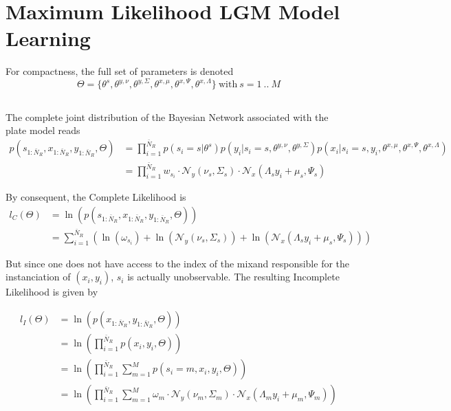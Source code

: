 \section{Maximum Likelihood LGM Model Learning}
For compactness, the full set of parameters is denoted
\begin{equation}
\Theta =\{\theta^s,\theta^{y,\nu}, \theta^{y,\Sigma}, \theta^{x,\mu}, \theta^{x,\Psi}, \theta^{x,\Lambda}\}\ \mathrm{with}\ s = 1\ ..\ M
\end{equation}
\subsection{}
The complete joint  distribution of the Bayesian Network associated with the plate model reads
\begin{align}
p(s_{1:\bar{N}_R},x_{1:\bar{N}_R},y_{1:\bar{N}_R},\Theta) &= \prod\limits_{i = 1}^{\bar{N}_R}p(s_i = s\vert\theta^s)
p(y_i\vert s_i = s, \theta^{y,\nu}, \theta^{y,\Sigma})p(x_i\vert s_i = s,y_i, \theta^{x,\mu}, \theta^{x,\Psi}, \theta^{x,\Lambda})
\nonumber \\ &=  \prod\limits_{i = 1}^{\bar{N}_R}w_{s_i}\cdot
\mathcal{N}_y\left(\nu_s,\Sigma_s\right)\cdot\mathcal{N}_x\left(\Lambda_sy_i + \mu_s,\Psi_s\right)
\end{align}

By consequent, the Complete Likelihood is
\begin{align}
l_C(\Theta)& = \ln\left(p(s_{1:\bar{N}_R},x_{1:\bar{N}_R},y_{1:\bar{N}_R},\Theta)\right)\nonumber\\
&= \sum\limits_{i = 1}^{\bar{N}_R}\left(\ln(\omega_{s_i}) + \ln\left(\mathcal{N}_y\left(\nu_s,\Sigma_s\right)\right)+ \ln\left(\mathcal{N}_x\left(\Lambda_sy_i + \mu_s,\Psi_s\right)\right)\right) 
\end{align}

But since one does not have access to the index of the mixand responsible for the instanciation of $(x_i,y_i)$, $s_i$ is actually unobservable. The resulting Incomplete Likelihood is given by

\begin{align}
l_I(\Theta)& = \ln\left(p(x_{1:\bar{N}_R},y_{1:\bar{N}_R},\Theta)\right)\nonumber\\
&=  \ln\left(\prod\limits_{i = 1}^{\bar{N}_R}p(x_i,y_i,\Theta)\right)\nonumber\\
&= \ln\left(\prod\limits_{i = 1}^{\bar{N}_R}\sum\limits_{m = 1}^{M}p(s_i = m,x_i,y_i,\Theta)\right)\nonumber\\
&= \ln\left(\prod\limits_{i = 1}^{\bar{N}_R}\sum\limits_{m = 1}^{M}\omega_m\cdot
\mathcal{N}_y\left(\nu_m,\Sigma_m\right)\cdot\mathcal{N}_x\left(\Lambda_my_i + \mu_m,\Psi_m\right)\right)
\end{align}


